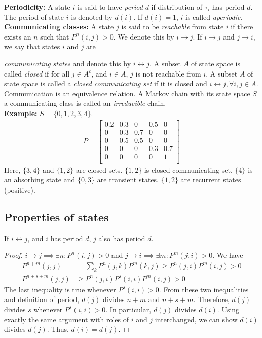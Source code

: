 \documentclass[all-lectures.tex]{subfiles}
\begin{document}
\textbf{Periodicity:} A state $i$ is said to have \textit{period} $d$ if distribution of $\tau_i$ has period $d$. The period of state $i$ is denoted by $d(i)$. If $d(i)=1$, $i$ is called \textit{aperiodic}. \\

\textbf{Communicating classes:} A state $j$ is said to be \textit{reachable} from state $i$ if there exists an $n$ such that $P^n(i,j) > 0$. We denote this by $i\rightarrow j$. If $i\rightarrow j$  and $j \rightarrow i$, we say that states $i$ and $j$ are 

\textit{communicating states} and denote this by $i \leftrightarrow j$. A subset $A$ of state space is called \textit{closed} if for all $j \in A^c$, and $i \in A$, $j$ is not reachable from $i$. A subset $A$ of state space is called a \textit{closed communicating set} if it is closed and $i \leftrightarrow j, \forall i,j \in A$. Communication is an equivalence relation. A Markov chain with its state space $S$ a communicating class is called an \textit{irreducible} chain.\\

\textbf{Example:} $S = \{0,1,2,3,4\}$.
\begin{align*}
	P = 
\begin{bmatrix}
	0.2      & 0.3 & 0 & 0.5 & 0  \\
    0      & 0.3 & 0.7 & 0 & 0 \\
	0      & 0.5 & 0.5 & 0 & 0  \\
   0      & 0 & 0 & 0.3 & 0.7  \\
    0      & 0 & 0 & 0 & 1 \\
\end{bmatrix}
\end{align*}
Here, $\{3,4\}$ and $\{1,2\}$ are closed sets. $\{1,2\}$ is closed communicating set. $\{4\}$ is an absorbing state and $\{0,3\}$ are transient states. $\{1,2\}$ are recurrent states (positive).
\subsection{Properties of states}
\begin{prop} \label{prop:periodicity_is_class_property}
If $i\leftrightarrow j$, and $i$ has period $d$, $j$ also has period $d$.
\begin{proof}
$i \rightarrow j \implies \exists n : P^n(i,j) > 0$ and $ j \rightarrow i \implies \exists m : P^m(j,i) > 0$. 
We have 
\begin{align*}
P^{n+m}(j,j) &= \sum_k P^n(j,k) P^m(k,j) \geq P^n(j,i) P^m(i,j) > 0 \\
P^{n+s+m}(j,j)  &\geq P^n(j,i) P^s(i,i) P^m(i,j) > 0
\end{align*}
The last inequality is true whenever $P^s(i,i) > 0$. From these two inequalities and definition of period, $d(j)$ divides $n+m$ and $n+s+m$. Therefore, $d(j)$ divides $s$ whenever $P^s(i,i) > 0$. In particular, $d(j)$ divides $d(i)$. Using exactly the same argument with roles of $i$ and $j$ interchanged, we can show $d(i)$ divides $d(j)$. Thus, $d(i) = d(j)$. \qedhere 
\end{proof}
\end{prop}
\end{document}
